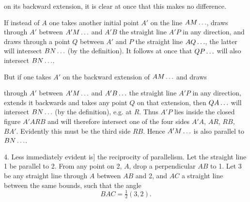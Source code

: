 on its backward extension, it is clear at once that this makes no difference.

If instead of $A$ one takes another initial point $A'$ on the line $AM\mathinner{.\,.\,.}$, draws through $A'$ between $A'M\mathinner{.\,.\,.}$ and $A'B$ the straight line $A'P$ in any direction, and draws through a point $Q$ between $A'$ and $P$ the straight line $AQ\mathinner{.\,.\,.}$, the latter will intersect $BN\mathinner{.\,.\,.}$ (by the definition). It follows at once that $QP\mathinner{.\,.\,.}$ will also intersect $BN\mathinner{.\,.\,.}$.

\begin{center}

\end{center}

But if one takes $A'$ on the backward extension of $AM\mathinner{.\,.\,.}$ and draws

\begin{center}

\end{center}
\noindent through $A'$ between $A'M\mathinner{.\,.\,.}$ and $A'B\mathinner{.\,.\,.}$ the straight line $A'P$ in any direction, extends it backwards and takes any point $Q$ on that extension, then $QA\mathinner{.\,.\,.}$ will intersect $BN\mathinner{.\,.\,.}$ (by the definition), e.g. at $R$. Thus $A'P$ lies inside the closed figure $A'ARB$ and will therefore intersect one of the four sides $A'A$, $AR$, $RB$, $BA'$. Evidently this must be the third side $RB$. Hence $A'M\mathinner{.\,.\,.}$ is also parallel to $BN\mathinner{.\,.\,.}$.

4. Less immediately evident is] the reciprocity of parallelism. Let the straight line 1 be parallel to 2. From any point on 2, $A$, drop a perpendicular $AB$ to 1. Let 3 be any straight line through $A$ between $AB$ and 2, and $AC$ a straight line between the same bounds, such that the angle
\[
BAC = \tfrac{1}{2}(3,2).
\]

